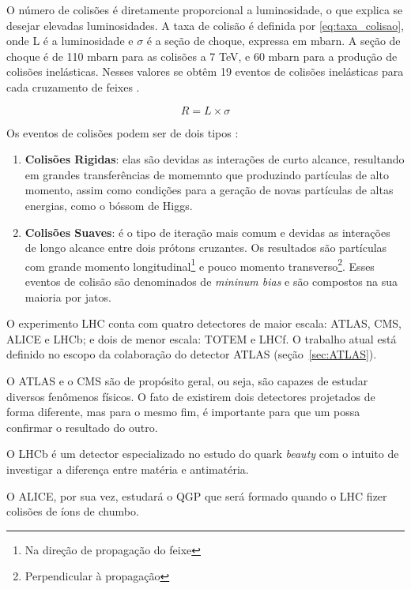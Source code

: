O número de colisões é diretamente proporcional a luminosidade, o que explica
se desejar elevadas luminosidades. A taxa de colisão é definida por
\ref{eq:taxa_colisao}, onde L é a luminosidade e $\sigma$ é a seção de choque,
expressa em mbarn. A seção de choque é de 110 mbarn para as colisões a 7 TeV, e
60 mbarn para a produção de colisões inelásticas.
Nesses valores se obtêm 19 eventos de colisões inelásticas para cada
cruzamento de feixes \cite{webLHC,ATLAS_TDR}.

\begin{equation}
R = L \times \sigma
\label{eq:taxa_colisao}
\end{equation}

Os eventos de colisões podem ser de dois tipos \cite{THESIS_LAR}:

\begin{enumerate}
\item \textbf{Colisões Rigidas}:
elas são devidas as interações de curto alcance,
resultando em grandes transferências de momemnto que produzindo partículas de
alto momento, assim como condições para a geração de novas partículas de altas
energias, como o bóssom de Higgs.
\item \textbf{Colisões Suaves}: 
é o tipo de iteração mais comum e devidas as interações de longo alcance entre dois prótons cruzantes. Os
resultados são partículas com grande momento longitudinal\footnote{Na direção de
propagação do feixe} e pouco momento transverso\footnote{Perpendicular à
propagação}. Esses eventos de colisão são
denominados de \emph{mininum bias} e são compostos na sua maioria por jatos.
\end{enumerate}

O experimento LHC conta com quatro detectores de maior escala: ATLAS, CMS, ALICE e
LHCb; e dois de menor escala: TOTEM e LHCf. O trabalho atual está definido no
escopo da colaboração do detector ATLAS (seção~\ref{sec:ATLAS}).

O ATLAS e o CMS são de propósito geral, ou seja, são capazes de estudar diversos
fenômenos físicos. O fato de existirem dois detectores projetados de forma
diferente, mas para o mesmo fim, é importante para que um possa confirmar o
resultado do outro.

O LHCb é um detector especializado no estudo do quark \textit{beauty} com o
intuito de investigar a diferença entre matéria e antimatéria.

O ALICE, por sua vez, estudará o QGP que será formado quando o
LHC fizer colisões de íons de chumbo.

